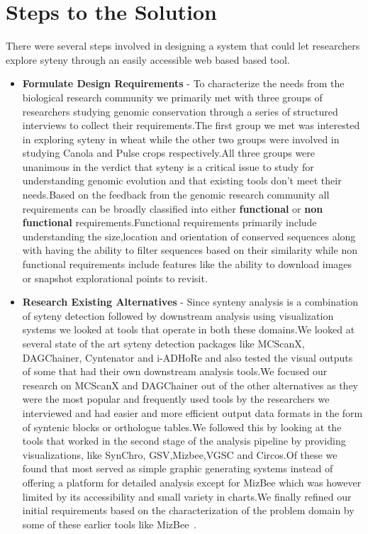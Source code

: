 \section{Steps to the Solution} 
There were several steps involved in designing a system that could let researchers explore syteny through an easily accessible web based based tool.

\begin{itemize}
    
    \item \textbf{Formulate Design Requirements} -
    To characterize the needs from the biological research community we primarily met with three groups of researchers studying genomic conservation through a series of structured interviews to collect their requirements.The first group we met was interested in exploring syteny in wheat while the other two groups were involved in studying Canola and Pulse crops respectively.All three groups were unanimous in the verdict that syteny is a critical issue to study for understanding genomic evolution and that existing tools don't meet their needs.Based on the feedback from the genomic research community all requirements can be broadly classified into either \textbf{functional} or \textbf{non functional} requirements.Functional requirements primarily include understanding the size,location and orientation of conserved sequences along with having the ability to filter sequences based on their similarity while non functional requirements include features like the ability to download images or snapshot explorational points to revisit.
    
    \item \textbf{Research Existing Alternatives} - 
    Since synteny analysis is a combination of syteny detection followed by downstream analysis using visualization systems we looked at tools that operate in both these domains.We looked at several state of the art syteny detection packages like MCScanX, DAGChainer, Cyntenator and i-ADHoRe and also tested the visual outputs of some that had their own downstream analysis tools.We focused our research on MCScanX and DAGChainer out of the other alternatives as they were the most popular and frequently used tools by the researchers we interviewed and had easier and more efficient output data formats in the form of syntenic blocks or orthologue tables.We followed this by looking at the tools that worked  in the second stage of the analysis pipeline by providing visualizations, like SynChro, GSV,Mizbee,VGSC and Circos.Of these we found that most served as simple graphic generating systems instead of offering a platform for detailed analysis except for MizBee which was however limited by its accessibility and small variety in charts.We finally refined our initial requirements based on the characterization of the problem domain by some of these earlier tools like MizBee~\cite{Meyer2009}.


\end{itemize}
